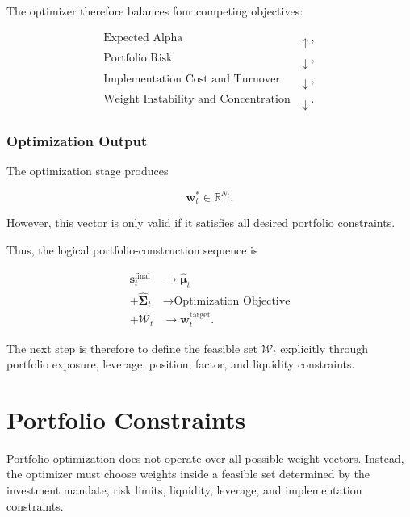 \documentclass[11pt,a4paper]{article}
\begin{document}
The optimizer therefore balances four competing objectives:

\begin{equation}
\boxed{
\begin{aligned}
\text{Expected Alpha}
&\uparrow,
\\
\text{Portfolio Risk}
&\downarrow,
\\
\text{Implementation Cost and Turnover}
&\downarrow,
\\
\text{Weight Instability and Concentration}
&\downarrow.
\end{aligned}
}
\end{equation}


\subsubsection{Optimization Output}

The optimization stage produces

\begin{equation}
\boxed{
\mathbf{w}_t^{*}
\in
\mathbb{R}^{N_t}.
}
\end{equation}

However, this vector is only valid if it satisfies all desired portfolio
constraints.

Thus, the logical portfolio-construction sequence is

\begin{equation}
\boxed{
\begin{aligned}
\mathbf{s}_t^{\mathrm{final}}
&\rightarrow
\widehat{\boldsymbol{\mu}}_t
\\
+
\widehat{\boldsymbol{\Sigma}}_t
&\rightarrow
\text{Optimization Objective}
\\
+
\mathcal{W}_t
&\rightarrow
\mathbf{w}_t^{\mathrm{target}}.
\end{aligned}
}
\end{equation}

The next step is therefore to define the feasible set
$\mathcal{W}_t$ explicitly through portfolio exposure, leverage, position,
factor, and liquidity constraints.

\section{Portfolio Constraints}
\label{sec:portfolio_constraints}

Portfolio optimization does not operate over all possible weight vectors.
Instead, the optimizer must choose weights inside a feasible set determined by
the investment mandate, risk limits, liquidity, leverage, and implementation
constraints.
\end{document}
